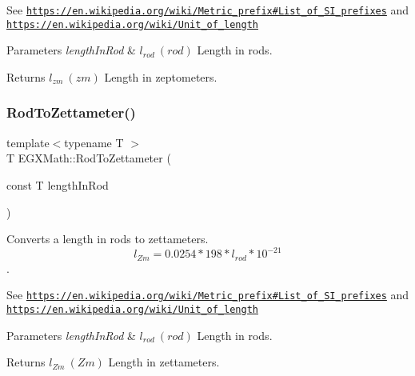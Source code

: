 See \href{https://en.wikipedia.org/wiki/Metric_prefix#List_of_SI_prefixes}{\tt https\+://en.\+wikipedia.\+org/wiki/\+Metric\+\_\+prefix\#\+List\+\_\+of\+\_\+\+S\+I\+\_\+prefixes} and \href{https://en.wikipedia.org/wiki/Unit_of_length}{\tt https\+://en.\+wikipedia.\+org/wiki/\+Unit\+\_\+of\+\_\+length} 
\begin{DoxyParams}{Parameters}
{\em length\+In\+Rod} & $ l_{rod}\ (rod)$ Length in rods. \\
\hline
\end{DoxyParams}
\begin{DoxyReturn}{Returns}
$ l_{zm}\ (zm)$ Length in zeptometers. 
\end{DoxyReturn}
\mbox{\label{group___e_g_x_math-_conversions-_length_conversions-_imperial-_rod-_s_i_gaccf39081a4e69ba4b9384ef6f9c354d7}} 
\subsubsection{\texorpdfstring{Rod\+To\+Zettameter()}{RodToZettameter()}}
{\footnotesize\ttfamily template$<$typename T $>$ \\
T E\+G\+X\+Math\+::\+Rod\+To\+Zettameter (\begin{DoxyParamCaption}\item[{const T}]{length\+In\+Rod }\end{DoxyParamCaption})}



Converts a length in rods to zettameters. \[ l_{Zm}=0.0254 * 198 * l_{rod} * 10^{-21} \]. 

See \href{https://en.wikipedia.org/wiki/Metric_prefix#List_of_SI_prefixes}{\tt https\+://en.\+wikipedia.\+org/wiki/\+Metric\+\_\+prefix\#\+List\+\_\+of\+\_\+\+S\+I\+\_\+prefixes} and \href{https://en.wikipedia.org/wiki/Unit_of_length}{\tt https\+://en.\+wikipedia.\+org/wiki/\+Unit\+\_\+of\+\_\+length} 
\begin{DoxyParams}{Parameters}
{\em length\+In\+Rod} & $ l_{rod}\ (rod)$ Length in rods. \\
\hline
\end{DoxyParams}
\begin{DoxyReturn}{Returns}
$ l_{Zm}\ (Zm)$ Length in zettameters. 
\end{DoxyReturn}
